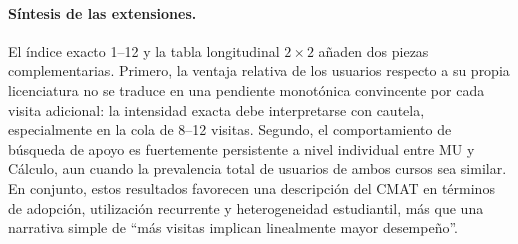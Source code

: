 \paragraph{Síntesis de las extensiones.}
El índice exacto 1--12 y la tabla longitudinal $2\times2$ añaden dos piezas complementarias. Primero, la ventaja relativa de los usuarios respecto a su propia licenciatura no se traduce en una pendiente monotónica convincente por cada visita adicional: la intensidad exacta debe interpretarse con cautela, especialmente en la cola de 8--12 visitas. Segundo, el comportamiento de búsqueda de apoyo es fuertemente persistente a nivel individual entre MU y Cálculo, aun cuando la prevalencia total de usuarios de ambos cursos sea similar. En conjunto, estos resultados favorecen una descripción del CMAT en términos de adopción, utilización recurrente y heterogeneidad estudiantil, más que una narrativa simple de ``más visitas implican linealmente mayor desempeño''.

